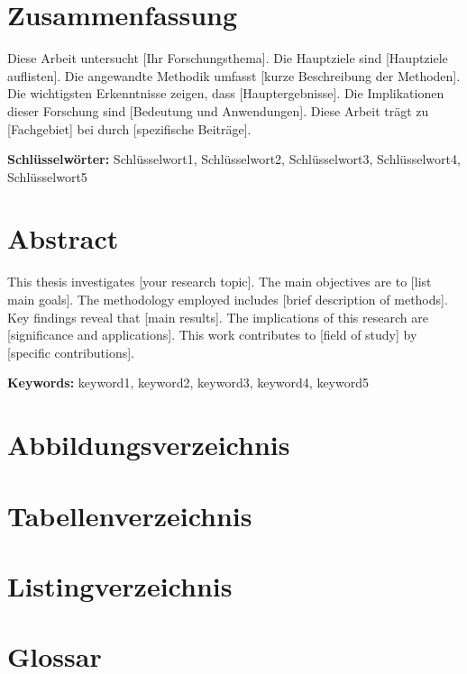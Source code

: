 \documentclass[oneside,bibliography=totocnumbered,BCOR=5mm]{scrbook}
\begin{document}
\chapter*{Zusammenfassung}
Diese Arbeit untersucht [Ihr Forschungsthema]. Die Hauptziele sind [Hauptziele auflisten]. Die angewandte Methodik umfasst [kurze Beschreibung der Methoden]. Die wichtigsten Erkenntnisse zeigen, dass [Hauptergebnisse]. Die Implikationen dieser Forschung sind [Bedeutung und Anwendungen]. Diese Arbeit trägt zu [Fachgebiet] bei durch [spezifische Beiträge].

\textbf{Schlüsselwörter:} Schlüsselwort1, Schlüsselwort2, Schlüsselwort3, Schlüsselwort4, Schlüsselwort5

\chapter*{Abstract}
This thesis investigates [your research topic]. The main objectives are to [list main goals]. The methodology employed includes [brief description of methods]. Key findings reveal that [main results]. The implications of this research are [significance and applications]. This work contributes to [field of study] by [specific contributions].

\textbf{Keywords:} keyword1, keyword2, keyword3, keyword4, keyword5


\chapter*{Abbildungsverzeichnis}
\listoffigures

\chapter*{Tabellenverzeichnis}
\listoftables

\chapter*{Listingverzeichnis}
\lstlistoflistings

\chapter*{Glossar}
\printglossary[title=Glossar]
\end{document}
